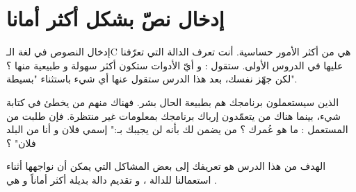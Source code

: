 \chapter{إدخال نصّ بشكل أكثر أمانا}

إدخال النصوص في لغة الـ\textenglish{C}
هي من أكثر الأمور حساسية. أنت تعرف الدالة
التي تعرّفنا عليها في الدروس الأولى. ستقول : و أيّ الأدوات ستكون أكثر سهولة و طبيعية منها ؟ لكن جهّز نفسك، بعد هذا الدرس ستقول عنها أي شيء باستثناء "بسيطة".

الذين سيستعملون برنامجك هم بطبيعة الحال بشر. فهناك منهم من يخطئ في كتابة شيء، بينما هناك من يتعمّدون إرباك برنامجك بمعلومات غير منتظرة. فإن طلبت من المستعمل : ما هو عُمرك ؟ من يضمن لك بأنه لن يجيبك بـ:" إسمي فلان و أنا من البلد فلان" ؟

الهدف من هذا الدرس هو تعريفك إلى بعض المشاكل التي يمكن أن نواجهها أثناء استعمالنا للدالة
،
و تقديم دالة بديلة أكثر أماناً و هي
.
